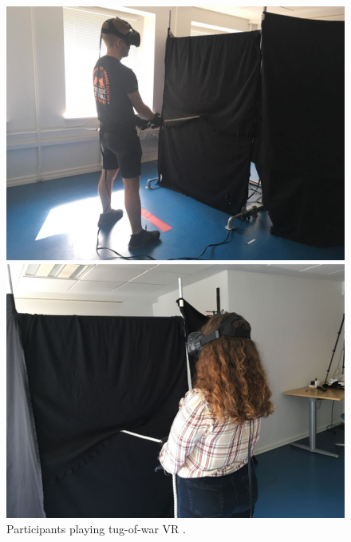 \begin{figure}[H]
  \centering
  \captionsetup{justification=centering,margin=0.1cm}
\hspace*{\fill}
  \begin{minipage}[b]{0.4\textwidth}
    \includegraphics[width=\textwidth]{Images/Participants/m1.jpg}
  \end{minipage}
  \hfill
  \begin{minipage}[b]{0.4\textwidth}
    \includegraphics[width=\textwidth]{Images/Participants/f1.jpg}
  \end{minipage}
\hspace*{\fill}
     \caption{Participants playing tug-of-war VR  .}
     \label{fig:participants}
\end{figure}
